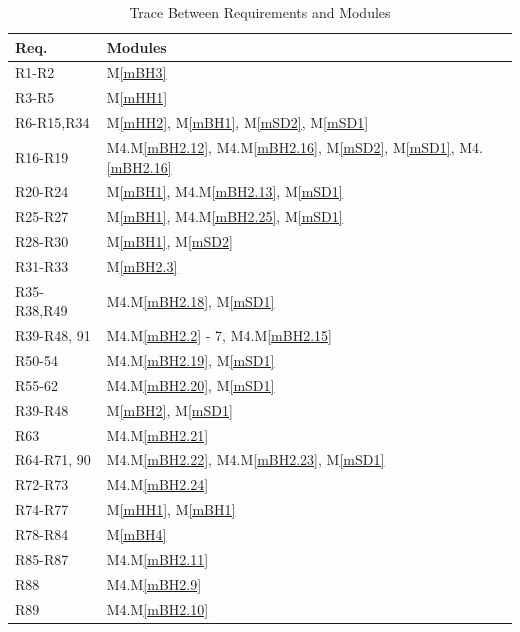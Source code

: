 \documentclass[12pt, titlepage]{article}
\newcommand{\mref}[1]{M\ref{#1}}
\begin{document}
\begin{table}[H]
\centering
\begin{tabular}{p{} p{}}
\toprule
\textbf{Req.} & \textbf{Modules}\\
\midrule
R1-R2 & \mref{mBH3}\\
R3-R5 & \mref{mHH1}\\
R6-R15,R34 &  \mref{mHH2}, \mref{mBH1}, \mref{mSD2}, \mref{mSD1}\\
R16-R19 & M4.\mref{mBH2.12},  M4.\mref{mBH2.16}, \mref{mSD2}, \mref{mSD1}, M4.\ref{mBH2.16}\\
R20-R24 & \mref{mBH1}, M4.\mref{mBH2.13}, \mref{mSD1}\\
R25-R27 & \mref{mBH1}, M4.\mref{mBH2.25}, \mref{mSD1}\\
R28-R30 & \mref{mBH1}, \mref{mSD2}\\
R31-R33 & \mref{mBH2.3}\\
R35-R38,R49 & M4.\mref{mBH2.18}, \mref{mSD1}\\
R39-R48, 91 & M4.\mref{mBH2.2} - 7, M4.\mref{mBH2.15}\\
R50-54 & M4.\mref{mBH2.19}, \mref{mSD1}\\
R55-62 & M4.\mref{mBH2.20}, \mref{mSD1}\\
R39-R48 & \mref{mBH2}, \mref{mSD1}\\
R63 & M4.\mref{mBH2.21}\\
R64-R71, 90 & M4.\mref{mBH2.22}, M4.\mref{mBH2.23}, \mref{mSD1}\\
R72-R73 & M4.\mref{mBH2.24}\\
R74-R77 & \mref{mHH1}, \mref{mBH1}\\
R78-R84 & \mref{mBH4}\\
R85-R87 & M4.\mref{mBH2.11}\\
R88 & M4.\mref{mBH2.9}\\
R89 & M4.\mref{mBH2.10}\\

\bottomrule
\end{tabular}
\caption{Trace Between Requirements and Modules}
\label{TblRT}
\end{table}
\end{document}
